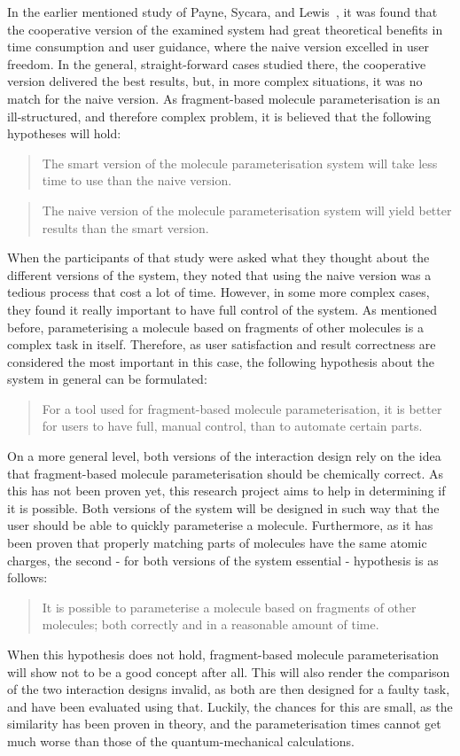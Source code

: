 In the earlier mentioned study of Payne, Sycara, and Lewis~\cite{payne2000varying}, it was found that the cooperative version of the examined system had great theoretical benefits in time consumption and user guidance, where the naive version excelled in user freedom. In the general, straight-forward cases studied there, the cooperative version delivered the best results, but, in more complex situations, it was no match for the naive version. As fragment-based molecule parameterisation is an ill-structured, and therefore complex problem, it is believed that the following hypotheses will hold:
\begin{quote}
The smart version of the molecule parameterisation system will take less time to use than the naive version.
\end{quote}
\begin{quote}
The naive version of the molecule parameterisation system will yield better results than the smart version.
\end{quote}

When the participants of that study were asked what they thought about the different versions of the system, they noted that using the naive version was a tedious process that cost a lot of time. However, in some more complex cases, they found it really important to have full control of the system. As mentioned before, parameterising a molecule based on fragments of other molecules is a complex task in itself. Therefore, as user satisfaction and result correctness are considered the most important in this case, the following hypothesis about the system in general can be formulated:
\begin{quote}
For a tool used for fragment-based molecule parameterisation, it is better for users to have full, manual control, than to automate certain parts.
\end{quote}

On a more general level, both versions of the interaction design rely on the idea that fragment-based molecule parameterisation should be chemically correct. As this has not been proven yet, this research project aims to help in determining if it is possible. Both versions of the system will be designed in such way that the user should be able to quickly parameterise a molecule. Furthermore, as it has been proven that properly matching parts of molecules have the same atomic charges, the second - for both versions of the system essential - hypothesis is as follows:
\begin{quote}
It is possible to parameterise a molecule based on fragments of other molecules; both correctly and in a reasonable amount of time.
\end{quote}

When this hypothesis does not hold, fragment-based molecule parameterisation will show not to be a good concept after all. This will also render the comparison of the two interaction designs invalid, as both are then designed for a faulty task, and have been evaluated using that. Luckily, the chances for this are small, as the similarity has been proven in theory, and the parameterisation times cannot get much worse than those of the quantum-mechanical calculations.
